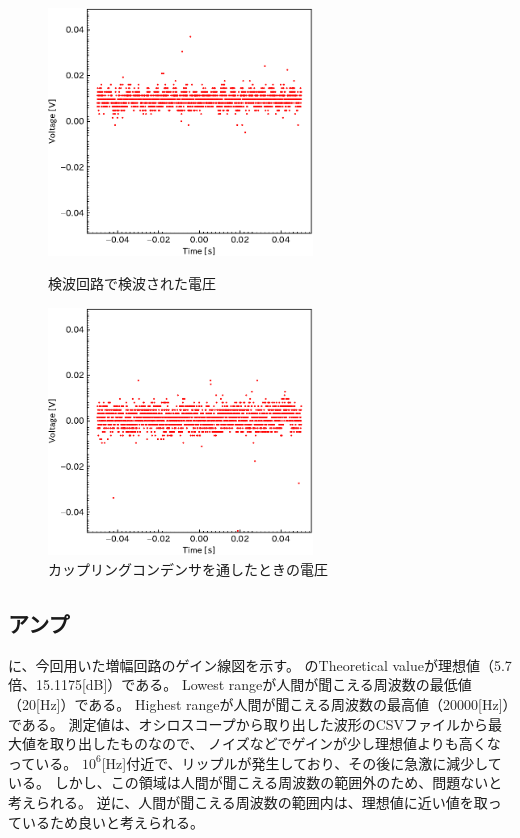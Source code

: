 \documentclass[report.tex]{subfiles}
\begin{document}
\begin{figure}[H]
	\begin{minipage}[b]{0.5\linewidth}
		\centering
		\includegraphics[width=7cm]{fig/koil_diode.pdf}
		\caption{検波回路で検波された電圧}
		\label{fig:koil_diode}
	\end{minipage}
	\begin{minipage}[b]{0.5\linewidth}
		\centering
		\includegraphics[width=7cm]{fig/koil_diode_bi.pdf}
		\caption{カップリングコンデンサを通したときの電圧}
		\label{fig:koil_diode_bi}
	\end{minipage}
\end{figure}

\subsection{アンプ}

に、今回用いた増幅回路のゲイン線図を示す。
のTheoretical valueが理想値（5.7倍、15.1175[dB]）である。
Lowest rangeが人間が聞こえる周波数の最低値（20[Hz]）である。
Highest rangeが人間が聞こえる周波数の最高値（20000[Hz]）である。
測定値は、オシロスコープから取り出した波形のCSVファイルから最大値を取り出したものなので、
ノイズなどでゲインが少し理想値よりも高くなっている。
\(10^6\)[Hz]付近で、リップルが発生しており、その後に急激に減少している。
しかし、この領域は人間が聞こえる周波数の範囲外のため、問題ないと考えられる。
逆に、人間が聞こえる周波数の範囲内は、理想値に近い値を取っているため良いと考えられる。
\end{document}
